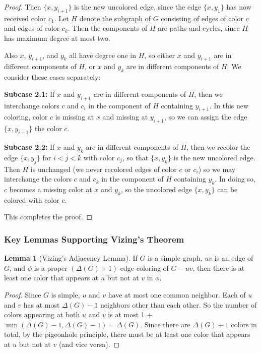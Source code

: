 \documentclass{article}
\theoremstyle{definition}
\newtheorem{lemma}{Lemma}
\begin{document}
\begin{proof}
Then $\{x, y_{i+1}\}$ is the new uncolored edge, since the edge $\{x, y_1\}$ has now received color $c_1$. Let $H$ denote the subgraph of $G$ consisting of edges of color $c$ and edges of color $c_k$. Then the components of $H$ are paths and cycles, since $H$ has maximum degree at most two. 

Also $x$, $y_{i+1}$, and $y_k$ all have degree one in $H$, so either $x$ and $y_{i+1}$ are in different components of $H$, or $x$ and $y_k$ are in different components of $H$. We consider these cases separately:

\textbf{Subcase 2.1:} If $x$ and $y_{i+1}$ are in different components of $H$, then we interchange colors $c$ and $c_i$ in the component of $H$ containing $y_{i+1}$. In this new coloring, color $c$ is missing at $x$ and missing at $y_{i+1}$, so we can assign the edge $\{x, y_{i+1}\}$ the color $c$.

\textbf{Subcase 2.2:} If $x$ and $y_k$ are in different components of $H$, then we recolor the edge $\{x, y_j\}$ for $i < j < k$ with color $c_j$, so that $\{x, y_k\}$ is the new uncolored edge. Then $H$ is unchanged (we never recolored edges of color $c$ or $c_i$) so we may interchange the colors $c$ and $c_k$ in the component of $H$ containing $y_k$. In doing so, $c$ becomes a missing color at $x$ and $y_k$, so the uncolored edge $\{x, y_k\}$ can be colored with color $c$.

This completes the proof.
\end{proof}

\subsubsection{Key Lemmas Supporting Vizing's Theorem}

\begin{lemma}[Vizing's Adjacency Lemma]
If $G$ is a simple graph, $uv$ is an edge of $G$, and $\phi$ is a proper $(\Delta(G) + 1)$-edge-coloring of $G - uv$, then there is at least one color that appears at $u$ but not at $v$ in $\phi$.
\end{lemma}

\begin{proof}
Since $G$ is simple, $u$ and $v$ have at most one common neighbor. Each of $u$ and $v$ has at most $\Delta(G) - 1$ neighbors other than each other. So the number of colors appearing at both $u$ and $v$ is at most 1 + $\min(\Delta(G) - 1, \Delta(G) - 1) = \Delta(G)$. Since there are $\Delta(G) + 1$ colors in total, by the pigeonhole principle, there must be at least one color that appears at $u$ but not at $v$ (and vice versa).
\end{proof}
\end{document}

